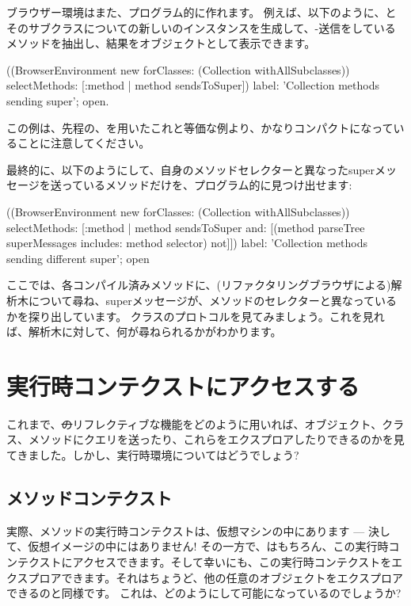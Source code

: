 \documentclass[a4paper,10pt,twoside]{book}
\begin{document}
ブラウザー環境はまた、プログラム的に作れます。
例えば、以下のように、とそのサブクラスについての新しいのインスタンスを生成して、\super-送信をしているメソッドを抽出し、結果をオブジェクトとして表示できます。
\begin{code}{}
((BrowserEnvironment new forClasses: (Collection withAllSubclasses))
	selectMethods: [:method | method sendsToSuper])
	label: 'Collection methods sending super';
	open.
\end{code}{}

この例は、先程の、を用いたこれと等価な例より、かなりコンパクトになっていることに注意してください。

最終的に、以下のようにして、自身のメソッドセレクターと異なったsuperメッセージを送っているメソッドだけを、プログラム的に見つけ出せます:
\begin{code}{}
((BrowserEnvironment new forClasses: (Collection withAllSubclasses))
	selectMethods: [:method | 
		method sendsToSuper
		and: [(method parseTree superMessages includes: method selector) not]])
	label: 'Collection methods sending different super';
	open
\end{code}
ここでは、各コンパイル済みメソッドに、(リファクタリングブラウザによる)解析木について尋ね、superメッセージが、メソッドのセレクターと異なっているかを探り出しています。
クラスのプロトコルを見てみましょう。これを見れば、解析木に対して、何が尋ねられるかがわかります。

\section{実行時コンテクストにアクセスする}

これまで、\st のリフレクティブな機能をどのように用いれば、オブジェクト、クラス、メソッドにクエリを送ったり、これらをエクスプロアしたりできるのかを見てきました。しかし、実行時環境についてはどうでしょう?

\subsection{メソッドコンテクスト}

実際、メソッドの実行時コンテクストは、仮想マシンの中にあります --- 決して、仮想イメージの中にはありません!
その一方で、はもちろん、この実行時コンテクストにアクセスできます。そして幸いにも、この実行時コンテクストをエクスプロアできます。それはちょうど、他の任意のオブジェクトをエクスプロアできるのと同様です。
これは、どのようにして可能になっているのでしょうか?
\end{document}

